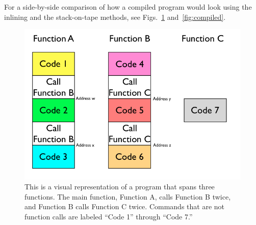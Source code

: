 For a side-by-side comparison of how a compiled program would look using the inlining and the stack-on-tape methods, see Figs.~\ref{fig:code} and~\ref{fig:compiled}.

\begin{figure} 
\begin{center} 
\includegraphics[scale=0.4]{figs/code.png} 
\caption{This is a visual representation of a program that spans three functions. The main function, Function A, calls Function B twice, and Function B calls Function C twice. Commands that are not function calls are labeled ``Code 1'' through ``Code 7.'' \label{fig:code}} 
\end{center} 
\end{figure}

